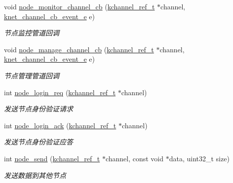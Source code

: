 \begin{DoxyCompactItemize}
void \hyperlink{a00102_a067d3665fb3a5e73408c4a27e5b2deca_a067d3665fb3a5e73408c4a27e5b2deca}{node\+\_\+monitor\+\_\+channel\+\_\+cb} (\hyperlink{a00066_a3b7e82599367eade261456f60ebe2cd9_a3b7e82599367eade261456f60ebe2cd9}{kchannel\+\_\+ref\+\_\+t} $\ast$channel, \hyperlink{a00066_a2fd2faf971268f5b682ab375c455f7c9_a2fd2faf971268f5b682ab375c455f7c9}{knet\+\_\+channel\+\_\+cb\+\_\+event\+\_\+e} e)
\begin{DoxyCompactList}\small\item\em 节点监控管道回调 \end{DoxyCompactList}\item 
void \hyperlink{a00102_ab050f58dec9e4479cf305004252c610c_ab050f58dec9e4479cf305004252c610c}{node\+\_\+manage\+\_\+channel\+\_\+cb} (\hyperlink{a00066_a3b7e82599367eade261456f60ebe2cd9_a3b7e82599367eade261456f60ebe2cd9}{kchannel\+\_\+ref\+\_\+t} $\ast$channel, \hyperlink{a00066_a2fd2faf971268f5b682ab375c455f7c9_a2fd2faf971268f5b682ab375c455f7c9}{knet\+\_\+channel\+\_\+cb\+\_\+event\+\_\+e} e)
\begin{DoxyCompactList}\small\item\em 节点管理管道回调 \end{DoxyCompactList}\item 
int \hyperlink{a00102_aa64e385bd42b4b6fe72cfcd137a99fe2_aa64e385bd42b4b6fe72cfcd137a99fe2}{node\+\_\+login\+\_\+req} (\hyperlink{a00066_a3b7e82599367eade261456f60ebe2cd9_a3b7e82599367eade261456f60ebe2cd9}{kchannel\+\_\+ref\+\_\+t} $\ast$channel)
\begin{DoxyCompactList}\small\item\em 发送节点身份验证请求 \end{DoxyCompactList}\item 
int \hyperlink{a00102_a43805096b878b93a1118eabd0a5f9799_a43805096b878b93a1118eabd0a5f9799}{node\+\_\+login\+\_\+ack} (\hyperlink{a00066_a3b7e82599367eade261456f60ebe2cd9_a3b7e82599367eade261456f60ebe2cd9}{kchannel\+\_\+ref\+\_\+t} $\ast$channel)
\begin{DoxyCompactList}\small\item\em 发送节点身份验证应答 \end{DoxyCompactList}\item 
int \hyperlink{a00102_a831f5f4ac169e5ed74b828acf7b39a1c_a831f5f4ac169e5ed74b828acf7b39a1c}{node\+\_\+send} (\hyperlink{a00066_a3b7e82599367eade261456f60ebe2cd9_a3b7e82599367eade261456f60ebe2cd9}{kchannel\+\_\+ref\+\_\+t} $\ast$channel, const void $\ast$data, uint32\+\_\+t size)
\begin{DoxyCompactList}\small\item\em 发送数据到其他节点 \end{DoxyCompactList}\item 

\end{DoxyCompactItemize}
